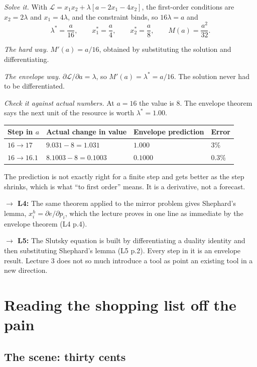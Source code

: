 \documentclass[11pt,letterpaper]{article}
\theoremstyle{definition}
\theoremstyle{plain}
\newcommand{\src}[1]{{\small\textsf{(#1)}}}
\newcommand{\fwd}[1]{\textsf{\textbf{$\rightarrow$ #1:}}}
\begin{document}
\emph{Solve it.} With $\mathcal{L} = x_1 x_2 + \lambda[a - 2x_1 - 4x_2]$, the first-order conditions
are $x_2 = 2\lambda$ and $x_1 = 4\lambda$, and the constraint binds, so $16\lambda = a$ and
\[
\lambda^* = \frac{a}{16}, \qquad x_1^* = \frac{a}{4}, \qquad x_2^* = \frac{a}{8},
\qquad M(a) = \frac{a^2}{32}.
\]

\emph{The hard way.} $M'(a) = a/16$, obtained by substituting the solution and differentiating.

\emph{The envelope way.} $\partial \mathcal{L} / \partial a = \lambda$, so $M'(a) = \lambda^* = a/16$.
The solution never had to be differentiated.

\emph{Check it against actual numbers.} At $a = 16$ the value is 8. The envelope theorem says the
next unit of the resource is worth $\lambda^* = 1.00$.

\begin{center}
\begin{tabular}{@{}llll@{}}
\toprule
\textbf{Step in $a$} & \textbf{Actual change in value} & \textbf{Envelope prediction} & \textbf{Error} \\
\midrule
$16 \to 17$ & $9.031 - 8 = 1.031$ & $1.000$ & 3\% \\
$16 \to 16.1$ & $8.1003 - 8 = 0.1003$ & $0.1000$ & 0.3\% \\
\bottomrule
\end{tabular}
\end{center}

The prediction is not exactly right for a finite step and gets better as the step shrinks, which is
what ``to first order'' means. It is a derivative, not a forecast.

\fwd{L4} The same theorem applied to the mirror problem gives Shephard's lemma,
$x_i^h = \partial e / \partial p_i$, which the lecture proves in one line as immediate by the envelope
theorem \src{L4 p.4}.

\fwd{L5} The Slutsky equation is built by differentiating a duality identity and then substituting
Shephard's lemma \src{L5 p.2}. Every step in it is an envelope result. Lecture 3 does not so much
introduce a tool as point an existing tool in a new direction.

\section{Reading the shopping list off the pain}
\label{sec:q6}

\subsection{The scene: thirty cents}
\end{document}
